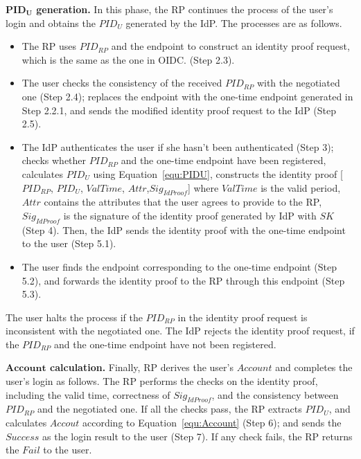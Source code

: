 \vspace{1mm}\noindent\textbf{$\mathbf{PID_U}$ generation.}
In this phase, the RP continues the process of the user's login and obtains the $PID_U$ generated by the IdP. The processes are as follows.
\begin{itemize}
  \item The RP uses $PID_{RP}$ and the endpoint to construct an identity proof request, which is the same as the one in  OIDC. (Step 2.3).
  \item The user checks the consistency of the received $PID_{RP}$  with the negotiated one (Step 2.4); replaces the endpoint with the one-time endpoint generated in Step 2.2.1, and sends the modified identity proof request to the IdP (Step 2.5).
  \item The IdP authenticates the user if she hasn't been authenticated (Step 3); checks whether $PID_{RP}$ and the one-time endpoint have been registered,
   calculates $PID_U$ using Equation~\ref{equ:PIDU},  constructs the identity proof [$PID_{RP}$, $PID_U$, $ValTime$, $Attr$,$Sig_{IdProof}$] where $ValTime$ is the valid period, $Attr$ contains the  attributes that the user agrees to provide to the RP, $Sig_{IdProof}$ is the signature of the identity proof generated by IdP with $SK$ (Step 4). Then, the IdP sends the identity proof with the one-time endpoint to the user (Step 5.1).
  \item The user finds  the  endpoint corresponding to the one-time endpoint (Step 5.2),
   and forwards the identity proof to the RP through this endpoint (Step 5.3).
\end{itemize}
The user halts the process if the $PID_{RP}$ in the identity proof request is inconsistent with  the negotiated one.
The IdP rejects the identity proof request, if the $PID_{RP}$ and the one-time endpoint have not been registered.


\vspace{1mm}\noindent\textbf{$\mathbf{Account}$ calculation.}
Finally, RP derives the user's  $Account$ and completes the user's login as follows. The RP performs the checks on the identity proof, including the valid time, correctness of $Sig_{IdProof}$, and   the consistency between $PID_{RP}$ and the  negotiated one. If all the checks pass, the RP extracts $PID_U$, and calculates $Accout$ according to Equation~\ref{equ:Account} (Step 6); and sends the $Success$ as the login result to the user (Step 7). If any check fails, the RP returns the $Fail$ to the user.

